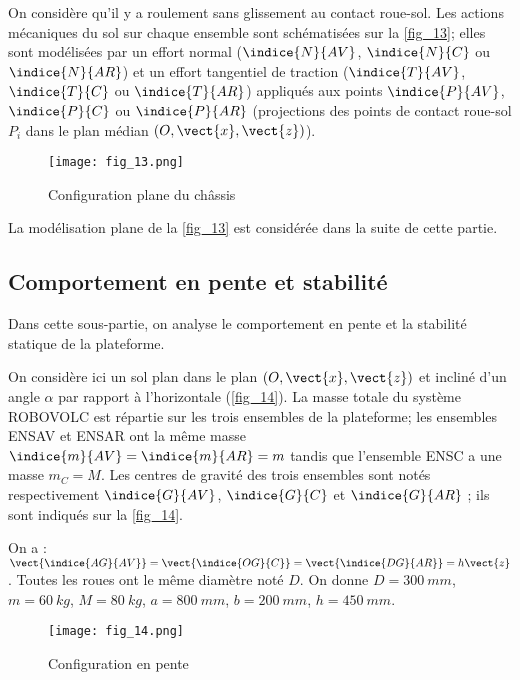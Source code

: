 On considère qu'il y a roulement sans glissement au contact roue-sol. Les actions mécaniques du
sol sur chaque ensemble sont schématisées sur la \autoref{fig_13}; elles sont modélisées par un effort
normal ($\indice{N}{AV}$, $\indice{N}{C}$ ou $\indice{N}{AR}$) et un effort tangentiel de traction ($\indice{T}{AV}$, $\indice{T}{C}$ ou $\indice{T}{AR}$) appliqués aux
points $\indice{P}{AV}$, $\indice{P}{C}$ ou $\indice{P}{AR}$ (projections des points de contact roue-sol $P_i$ dans le plan médian $\left(O,\vect{x},\vect{z}\right)$).

\begin{figure}[H]
\centering
\texttt{[image: fig\_13.png]}
\caption{Configuration plane du châssis\label{fig_13}}
\end{figure}


La modélisation plane de la \autoref{fig_13} est considérée dans la suite de cette partie.

\subsection{Comportement en pente et stabilité}
\begin{obj}
Dans cette sous-partie, on analyse le comportement en pente et la stabilité statique de la
plateforme.
\end{obj}

On considère ici un sol plan dans le plan $\left(O,\vect{x},\vect{z}\right)$ et incliné d'un angle $\alpha$ par rapport à
l'horizontale (\autoref{fig_14}). La masse totale du système ROBOVOLC est répartie sur les trois
ensembles de la plateforme; les ensembles ENSAV et ENSAR ont la même masse
$\indice{m}{AV}=\indice{m}{AR}=m$ tandis que l'ensemble ENSC a une masse $m_C=M$. Les centres de gravité des
trois ensembles sont notés respectivement $\indice{G}{AV}$, $\indice{G}{C}$ et $\indice{G}{AR}$ ; ils sont indiqués sur la \autoref{fig_14}.

On a : $\vect{\indice{AG}{AV}}=\vect{\indice{OG}{C}}=\vect{\indice{DG}{AR}}=h\vect{z}$. 
Toutes les roues ont le même diamètre noté $D$.
On donne $D =\SI{300}{mm}$, $m =\SI{60}{kg}$, $M =\SI{80}{kg}$, $a =\SI{800}{mm}$, $b =\SI{200}{mm}$, $h =\SI{450}{mm}$.


\begin{figure}[H]
\centering
\texttt{[image: fig\_14.png]}
\caption{Configuration en pente \label{fig_14}}
\end{figure}


